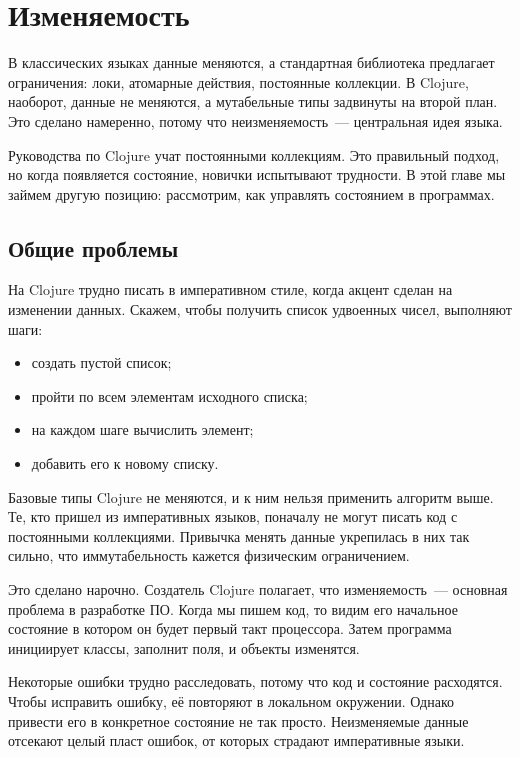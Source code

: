 \chapter{Изменяемость}


\begin{teaser}
В классических языках данные меняются, а стандартная библиотека предлагает
ограничения: локи, атомарные действия, постоянные коллекции. В Clojure,
наоборот, данные не меняются, а мутабельные типы задвинуты на второй план. Это
сделано намеренно, потому что неизменяемость~--- центральная идея языка.
\end{teaser}

Руководства по Clojure учат постоянными коллекциям. Это правильный подход, но
когда появляется состояние, новички испытывают трудности. В этой главе мы займем
другую позицию: рассмотрим, как управлять состоянием в программах.

\section{Общие проблемы}

На Clojure трудно писать в императивном стиле, когда акцент сделан на изменении
данных. Скажем, чтобы получить список удвоенных чисел, выполняют шаги:


\begin{itemize}
\item
  создать пустой список;
\item
  пройти по всем элементам исходного списка;
\item
  на каждом шаге вычислить элемент;
\item
  добавить его к новому списку.
\end{itemize}

Базовые типы Clojure не меняются, и к ним нельзя применить алгоритм выше. Те,
кто пришел из императивных языков, поначалу не могут писать код с постоянными
коллекциями. Привычка менять данные укрепилась в них так сильно, что
иммутабельность кажется физическим ограничением.

Это сделано нарочно. Создатель Clojure полагает, что изменяемость~--- основная
проблема в разработке ПО. Когда мы пишем код, то видим его начальное состояние в
котором он будет первый такт процессора. Затем программа инициирует классы,
заполнит поля, и объекты изменятся.

Некоторые ошибки трудно расследовать, потому что код и состояние
расходятся. Чтобы исправить ошибку, е\"{е} повторяют в локальном окружении. Однако
привести его в конкретное состояние не так просто. Неизменяемые данные отсекают
целый пласт ошибок, от которых страдают императивные языки.

